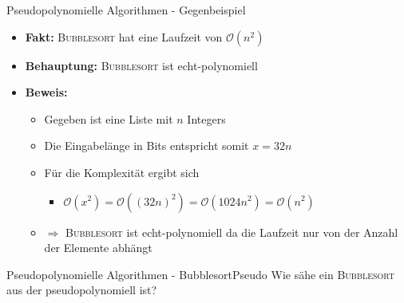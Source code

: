 \begin{frame}{Pseudopolynomielle Algorithmen - Gegenbeispiel}
    \begin{itemize}
        \item \textbf{Fakt:} \textsc{Bubblesort} hat eine Laufzeit von $\mathcal{O}(n^2)$
        \item \textbf{Behauptung:} \textsc{Bubblesort} ist echt-polynomiell
        \item \textbf{Beweis:}
        \begin{itemize}
            \item Gegeben ist eine Liste mit $n$ Integers
            \item Die Eingabelänge in Bits entspricht somit $x=32n$
            \item Für die Komplexität ergibt sich
            \begin{itemize}
                \item $\mathcal{O}(x^2)=\mathcal{O}((32n)^2)=\mathcal{O}(1024n^2)=\mathcal{O}(n^2)$      
            \end{itemize}
            \item[] $\Rightarrow$ \textsc{Bubblesort} ist echt-polynomiell da die Laufzeit nur von der Anzahl der Elemente abhängt
        \end{itemize}
    \end{itemize}
\end{frame}

\begin{frame}{Pseudopolynomielle Algorithmen - BubblesortPseudo}
    Wie sähe ein \textsc{Bubblesort} aus der pseudopolynomiell ist?
    
\end{frame}

